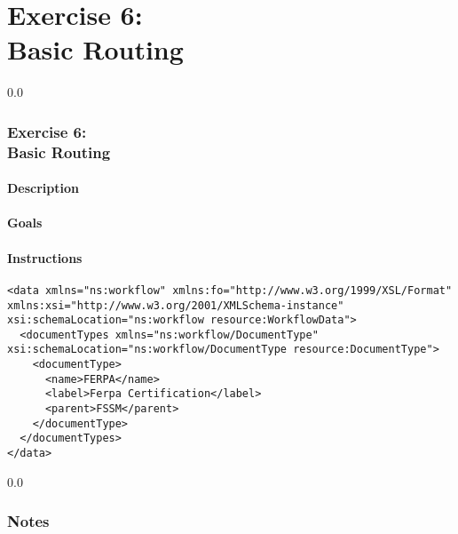 \part*{Exercise 6: \\
Basic Routing}

{\setlength{\baselineskip}%
  {0.0\baselineskip}
  \section*{\flushright Exercise 6: \\
Basic Routing}
  \hrulefill \par}

\subsection*{Description}

\subsection*{Goals}

\subsection*{Instructions}
\begin{verbatim}
<data xmlns="ns:workflow" xmlns:fo="http://www.w3.org/1999/XSL/Format" xmlns:xsi="http://www.w3.org/2001/XMLSchema-instance" xsi:schemaLocation="ns:workflow resource:WorkflowData">
  <documentTypes xmlns="ns:workflow/DocumentType" xsi:schemaLocation="ns:workflow/DocumentType resource:DocumentType">
    <documentType>
      <name>FERPA</name>
      <label>Ferpa Certification</label>
      <parent>FSSM</parent>
    </documentType>
  </documentTypes>
</data>
\end{verbatim}
\newpage
{\setlength{\baselineskip}%
  {0.0\baselineskip}
  \section*{Notes}
  \hrulefill \par}